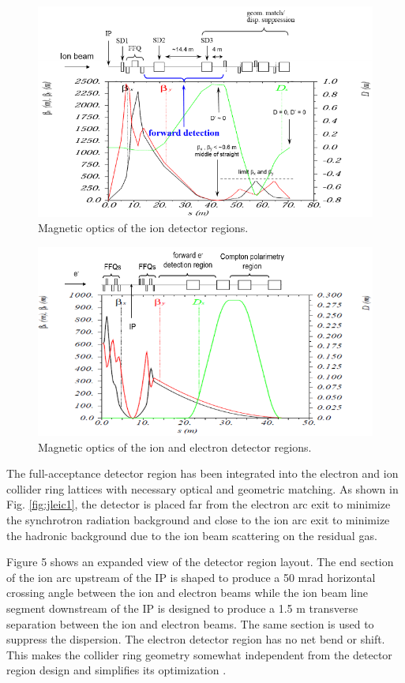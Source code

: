 \begin{figure}[!htb]
	\centering
	\includegraphics[width=.75\textwidth]{../../img/ion_magnet_optics}
	\caption{Magnetic optics of the ion detector regions.}
	\label{fig:ion_magnet_optics}
\end{figure}

\begin{figure}[!htb]
	\centering	
	\includegraphics[width=.75\textwidth]{../../img/electron_magnet_optics}	
	\caption{Magnetic optics of the ion and electron detector regions.}
	\label{fig:ele_magnet_optics}
	\end{figure}



The full-acceptance detector region has been integrated into the electron and ion collider ring lattices with necessary optical and geometric matching. As shown in Fig. \ref{fig:jleic1}, the detector is placed far from the electron arc exit to minimize the synchrotron radiation background and close to the ion arc exit to minimize the hadronic background due to the ion beam scattering on the residual gas.

Figure 5 shows an expanded view of the detector region layout. The end section of the ion arc upstream of the IP is shaped to produce a 50 mrad horizontal crossing angle between the ion and electron beams while the ion beam line segment downstream of the IP is designed to produce a 1.5 m transverse separation between the ion and electron beams. The same section is used to suppress the dispersion. The electron detector region has no net bend or shift. This makes the collider ring geometry somewhat independent from the detector region design and simplifies its optimization
 \cite{Lin}.

